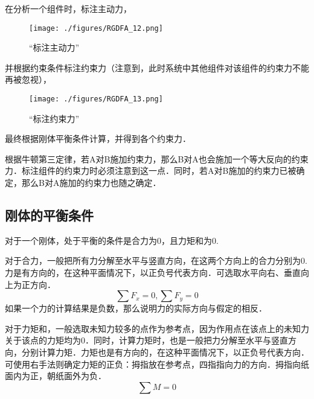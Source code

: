 在分析一个组件时，标注主动力，
\begin{figure}[ht]
\centering
\texttt{[image: ./figures/RGDFA\_12.png]}
\caption{“标注主动力”} \label{RGDFA_fig12}
\end{figure}
并根据约束条件标注约束力（注意到，此时系统中其他组件对该组件的约束力不能再被忽视），
\begin{figure}[ht]
\centering
\texttt{[image: ./figures/RGDFA\_13.png]}
\caption{“标注约束力”} \label{RGDFA_fig13}
\end{figure}
最终根据刚体平衡条件计算，并得到各个约束力．

根据牛顿第三定律，若A对B施加约束力，那么B对A也会施加一个等大反向的约束力．标注组件的约束力时必须注意到这一点．同时，若A对B施加的约束力已被确定，那么B对A施加的约束力也随之确定．

\subsection{刚体的平衡条件}
对于一个刚体，处于平衡的条件是合力为0，且力矩和为0.

对于合力，一般把所有力分解至水平与竖直方向，在这两个方向上的合力分别为0.力是有方向的，在这种平面情况下，以正负号代表方向．可选取水平向右、垂直向上为正方向．
\begin{equation}
\sum F_x=0, \sum F_y=0
\end{equation}
如果一个力的计算结果是负数，那么说明力的实际方向与假定的相反．

对于力矩和，一般选取未知力较多的点作为参考点，因为作用点在该点上的未知力关于该点的力矩均为0．同时，计算力矩时，也是一般把力分解至水平与竖直方向，分别计算力矩．力矩也是有方向的，在这种平面情况下，以正负号代表方向．可使用右手法则确定力矩的正负：拇指放在参考点，四指指向力的方向．拇指向纸面内为正，朝纸面外为负．
\begin{equation}
\sum M=0
\end{equation}

